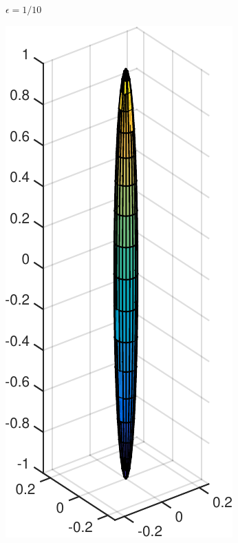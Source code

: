 \documentclass[a4paper,11pt]{kth-mag}
\begin{document}
\begin{figure}[!htbp]
\begin{subfigure}[h]{0.24\textwidth}
    \caption{$\epsilon=1/10$}\label{fig:slenderness_1_10}
  \end{subfigure}
  \begin{subfigure}[h]{0.24\textwidth}
    \centering
    \includegraphics[width=\textwidth]{img/slender/1_20.pdf}

\end{subfigure}
\end{figure}
\end{document}
